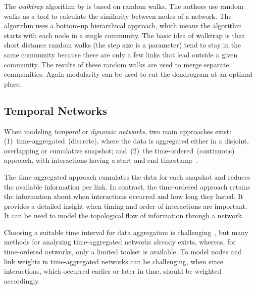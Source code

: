 The \emph{walktrap} algorithm by \textcite{pons2005computing} is based on random walks.
The authors use random walks as a tool to calculate the similarity between nodes of a network.
The algorithm uses a bottom-up hierarchical approach, which means the algorithm starts with each node in a single community.
The basic idea of walktrap is that short distance random walks (the step size is a parameter) tend to stay in the same community because there are only a few links that lead outside a given community.
The results of these random walks are used to merge separate communities.
Again modularity can be used to cut the dendrogram at an optimal place.

\subsection{Temporal Networks}
When modeling \emph{temporal} or \emph{dynamic networks}, two main approaches exist: (1)~time-aggregated~(discrete), where the data is aggregated either in a disjoint, overlapping or cumulative snapshot; and~(2)~the time-ordered~(continuous) approach, with interactions having a start and end timestamp~\cite{moody2005dynamic, Pinter-Wollman2014, blonder2012temporal}.

The time-aggregated approach cumulates the data for each snapshot and reduces the available information per link.
In contrast, the time-ordered approach retains the information about when interactions occurred and how long they lasted.
It provides a detailed insight when timing and order of interactions are important.
It can be used to model the topological flow of information through a network.

Choosing a suitable time interval for data aggregation is challenging~\cite{Pinter-Wollman2014}, but many methods for analyzing time-aggregated networks already exists, whereas, for time-ordered networks, only a limited toolset is available.
To model nodes and link weights in time-aggregated networks can be challenging, when since interactions, which occurred earlier or later in time, should be weighted accordingly.